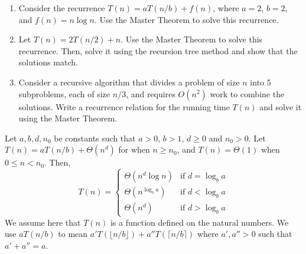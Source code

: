 \documentclass{article}
\begin{document}
\begin{enumerate}
    \item Consider the recurrence $T(n) = aT(n/b) + f(n)$, where $a=2$, $b=2$, and $f(n) = n\log n$.  Use the Master Theorem to solve this recurrence.

    \item  Let $T(n) = 2T(n/2) + n$.  Use the Master Theorem to solve this recurrence.  Then, solve it using the recursion tree method and show that the solutions match.

    \item  Consider a recursive algorithm that divides a problem of size $n$ into 5 subproblems, each of size $n/3$, and requires $O(n^2)$ work to combine the solutions. Write a recurrence relation for the running time $T(n)$ and solve it using the Master Theorem.
\end{enumerate}

\begin{theorem}
Let $a, b, d, n_0$ be constants such that $a > 0$, $b > 1$, $d \geq 0$ and $n_0 > 0$. Let $T(n) = aT(n/b) + \Theta(n^d)$ for when $n \geq n_0$, and $T(n) = \Theta(1)$ when $0 \leq n < n_0$. Then,
\[
T(n) = \begin{cases}
\Theta(n^d \log n) & \text{if } d = \log_b a \\
\Theta(n^{\log_b a}) & \text{if } d < \log_b a \\
\Theta(n^d) & \text{if } d > \log_b a
\end{cases}
\]
We assume here that $T(n)$ is a function defined on the natural numbers. We use $aT(n/b)$ to mean $a'T(\lfloor n/b \rfloor) + a''T(\lceil n/b \rceil)$ where $a', a'' > 0$ such that $a' + a'' = a$.
\end{theorem}
\end{document}
